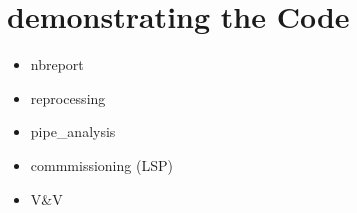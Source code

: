 \section{demonstrating the Code}
\begin{itemize}
\item nbreport
\item reprocessing
\item pipe\_analysis
\item commmissioning (LSP)
\item V\&V
\end{itemize}
